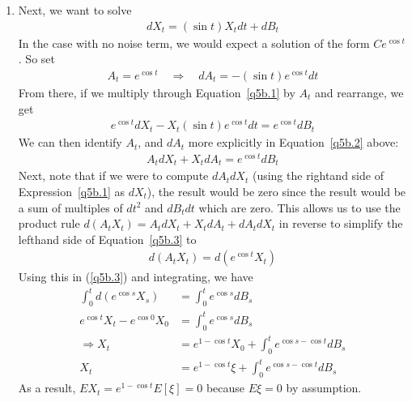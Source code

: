 \documentclass[12pt]{article}
\theoremstyle{plain}
\theoremstyle{definition}
\theoremstyle{remark}
\begin{document}
\begin{enumerate}
\begin{enumerate}
      \item %
        Next, we want to solve
        \begin{align}
          \label{q5b.1}
          dX_t = (\sin t) X_t dt + dB_t
          \end{align}
        In the case with no noise term, we would expect a solution of
        the form $Ce^{\cos t}$. So set
        \begin{align*}
          A_t = e^{\cos t}
          \quad \Rightarrow\quad
          dA_t = -(\sin t) e^{\cos t} dt
        \end{align*}
        From there, if we multiply through Equation~\ref{q5b.1} by $A_t$
        and rearrange, we get
        \begin{align}
          \label{q5b.2}
          e^{\cos t} dX_t - X_t (\sin t) e^{\cos t} dt = e^{\cos t} dB_t
        \end{align}
        We can then identify $A_t$, and $dA_t$ more explicitly in
        Equation~\ref{q5b.2} above:
        \begin{align}
          A_t dX_t + X_t dA_t = e^{\cos t} dB_t
          \label{q5b.3}
        \end{align}
        Next, note that if we were to compute $dA_t dX_t$ (using the
        rightand side of Expression~\ref{q5b.1} as $dX_t$), the result
        would be zero since the result would be a sum of multiples of
        $dt^2$ and $dB_t dt$ which are zero. This allows us to use the
        product rule $d(A_t X_t) = A_t dX_t + X_t dA_t + dA_t dX_t$ in
        reverse to simplify the lefthand side of Equation~\ref{q5b.3} to
        \begin{align}
          d(A_t X_t) = d\left( e^{\cos t} X_t\right)
        \end{align}
        Using this in (\ref{q5b.3}) and integrating, we have
        \begin{align*}
          \int^t_0 d\left( e^{\cos s} X_s\right) &=
          \int^t_0 e^{\cos s} dB_s \\
          e^{\cos t} X_t - e^{\cos 0} X_0 &=
          \int^t_0 e^{\cos s} dB_s \\
          \Rightarrow
          X_t &= e^{1-\cos t} X_0 +
          \int^t_0 e^{\cos s - \cos t} dB_s\\
          X_t &= e^{1-\cos t} \xi +
          \int^t_0 e^{\cos s - \cos t} dB_s
        \end{align*}
        As a result, $EX_t = e^{1-\cos t} E\left[ \xi\right] = 0$
        because $E\xi = 0$ by assumption.


\end{enumerate}
\end{enumerate}
\end{document}

